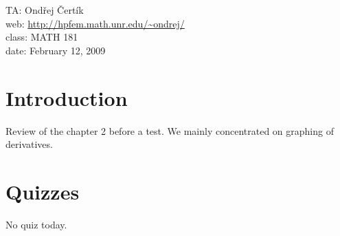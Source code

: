 \documentclass[10pt]{article}
\begin{document}
\noindent TA: Ondřej Čertík\\
web: \url{http://hpfem.math.unr.edu/~ondrej/}\\
class: MATH 181\\
date: February 12, 2009

\section{Introduction}

Review of the chapter 2 before a test. We mainly concentrated on graphing of
derivatives.

\section{Quizzes}

No quiz today.
\end{document}
